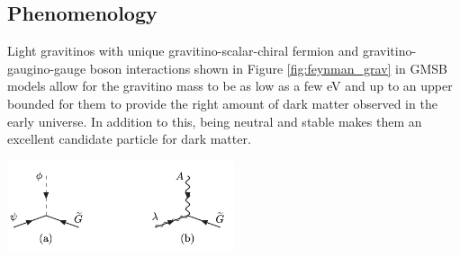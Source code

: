 {{\subsection{Phenomenology}
Light gravitinos with unique gravitino-scalar-chiral fermion and gravitino-gaugino-gauge boson interactions shown in Figure \ref{fig:feynman_grav} in GMSB models allow for the gravitino mass to be as low as a few eV and up to an upper bounded for them to
provide the right amount of dark matter observed in the early universe. In addition to this, being neutral and stable makes them an excellent candidate particle for dark matter.
\begin{center}
\centering
\mbox{\includegraphics[height=0.3\textwidth, width=0.5\textwidth]{THESISPLOTS/Gravitino-GauginoCoupling.png}} 
\label{fig:feynman_grav}
\end{center}
}}
